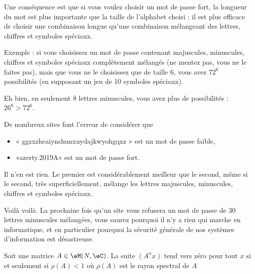 \begin{normaltext}
	Une conséquence est que si vous voulez choisir un mot de passe fort, la longueur du mot est plus importante que la taille de l'alphabet choisi : il est plus efficace de choisir une combinaison longue qu'une combinaison mélangeant des lettres, chiffres et symboles spéciaux.

	Exemple : si vous choisissez un mot de passe contenant majuscules, minuscules, chiffres et symboles spéciaux complètement mélangés (ne mentez pas, vous ne le faites pas), mais que vous ne le choisissez que de taille \( 6\), vous avez \( 72^6\) possibilités (en supposant un jeu de 10 symboles spéciaux).

	Eh bien, en seulement \( 8\) lettres minuscules, vous avez plus de possibilités : \( 26^8>72^6\).

	De nombreux sites font l'erreur de considérer que
	\begin{itemize}
		\item « ggzxzheaiynshunxuydajkwyohgqxz » est un mot de passe faible,
		\item «azerty.2019A» est un mot de passe fort.
	\end{itemize}
	Il n'en est rien. Le premier est considérablement meilleur que le second, même si le second, très superficiellement, mélange les lettres majuscules, minuscules, chiffres et symboles spéciaux.

	Voilà voilà. La prochaine fois qu'un site vous refusera un mot de passe de 30 lettres minuscules mélangées, vous saurez pourquoi il n'y a rien qui marche en informatique, et en particulier pourquoi la sécurité générale de nos systèmes d'information est désastreuse.
\end{normaltext}

\begin{theorem}     \label{THOooHWNWooTewPvt}
	Soit une matrice \( A\in \eM(N,\eC)\). La suite \( (A^nx)\) tend vers zéro pour tout \( x\) si et seulement si \( \rho(A)<1\) où \( \rho(A)\) est le rayon spectral de \( A\)
\end{theorem}

